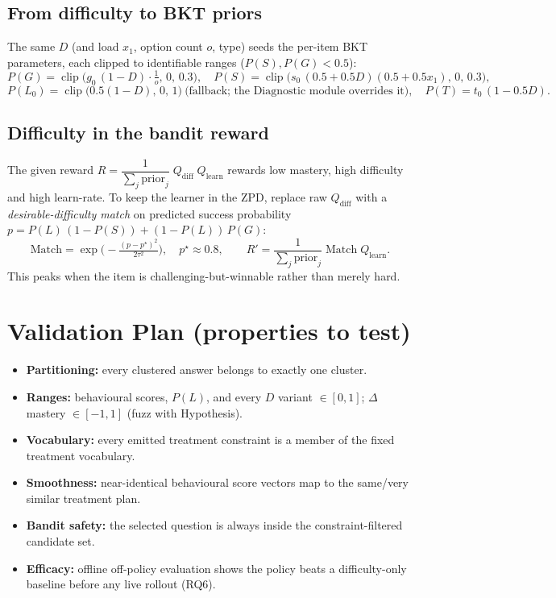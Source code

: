 \documentclass[11pt]{article}
\begin{document}
\subsection{From difficulty to BKT priors}\label{sec:priors}
The same $D$ (and load $x_1$, option count $o$, type) seeds the per-item BKT parameters, each clipped to identifiable ranges ($P(S),P(G)<0.5$):
\[
P(G)=\operatorname{clip}\!\big(g_0\,(1-D)\cdot \tfrac{1}{o},\,0,\,0.3\big),\quad
P(S)=\operatorname{clip}\!\big(s_0\,(0.5+0.5D)(0.5+0.5x_1),\,0,\,0.3\big),
\]
\[
P(L_0)=\operatorname{clip}\!\big(0.5(1-D),\,0,\,1\big)\ \text{(fallback; the Diagnostic module overrides it)},\quad
P(T)=t_0\,(1-0.5D).
\]

\subsection{Difficulty in the bandit reward}\label{sec:reward}
The given reward $R=\dfrac{1}{\sum_j \text{prior}_j}\;Q_{\text{diff}}\;Q_{\text{learn}}$ rewards low mastery, high difficulty and high learn-rate. To keep the learner in the ZPD, replace raw $Q_{\text{diff}}$ with a \emph{desirable-difficulty match} on predicted success probability
\(p=P(L)\,(1-P(S))+(1-P(L))\,P(G)\):
\[
\text{Match}=\exp\!\Big(-\tfrac{(p-p^\star)^2}{2\tau^2}\Big),\quad p^\star\approx0.8,\qquad
R' = \frac{1}{\sum_j \text{prior}_j}\;\text{Match}\;Q_{\text{learn}} .
\]
This peaks when the item is challenging-but-winnable rather than merely hard.

\section{Validation Plan (properties to test)}
\begin{itemize}
\item \textbf{Partitioning:} every clustered answer belongs to exactly one cluster.
\item \textbf{Ranges:} behavioural scores, $P(L)$, and every $D$ variant $\in[0,1]$; $\Delta$mastery $\in[-1,1]$ (fuzz with Hypothesis).
\item \textbf{Vocabulary:} every emitted treatment constraint is a member of the fixed treatment vocabulary.
\item \textbf{Smoothness:} near-identical behavioural score vectors map to the same/very similar treatment plan.
\item \textbf{Bandit safety:} the selected question is always inside the constraint-filtered candidate set.
\item \textbf{Efficacy:} offline off-policy evaluation shows the policy beats a difficulty-only baseline before any live rollout (RQ6).
\end{itemize}
\end{document}
